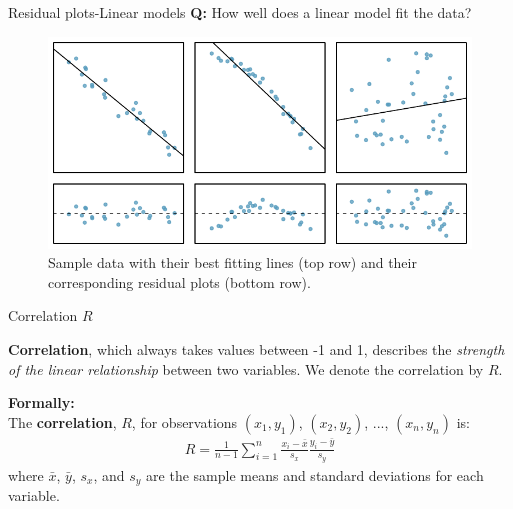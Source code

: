 \documentclass[12pt,a4paper]{beamer}
\begin{document}
\begin{frame}{Residual plots-Linear models}
	\textbf{Q:} How well does a linear model fit the data?
	\begin{figure}
	   \centering
	   \includegraphics[width=\textwidth]{figures/sampleLinesAndResPlots/sampleLinesAndResPlots}
	   \caption{Sample data with their best fitting lines (top row) and their corresponding residual plots (bottom row).}
	\end{figure}
\end{frame}
\begin{frame}{Correlation $R$}
	\begin{framed}
\textbf{Correlation}, which always takes values between -1 and 1, describes the \textit{strength of the linear relationship} between two variables. We denote the correlation by $R$.
	\end{framed}
	\begin{framed}
		\textbf{Formally:}\\
		The \textbf{correlation}, $R$, for observations $(x_1, y_1)$, $(x_2, y_2)$, ..., $(x_n, y_n)$ is:
		\begin{eqnarray*}
		R = \frac{1}{n-1}\sum_{i=1}^{n} \frac{x_i-\bar{x}}{s_x}\frac{y_i-\bar{y}}{s_y}
		\end{eqnarray*}
		where $\bar{x}$, $\bar{y}$, $s_x$, and $s_y$ are the sample means and standard deviations for each variable.
	\end{framed}
\end{frame}
\end{document}
